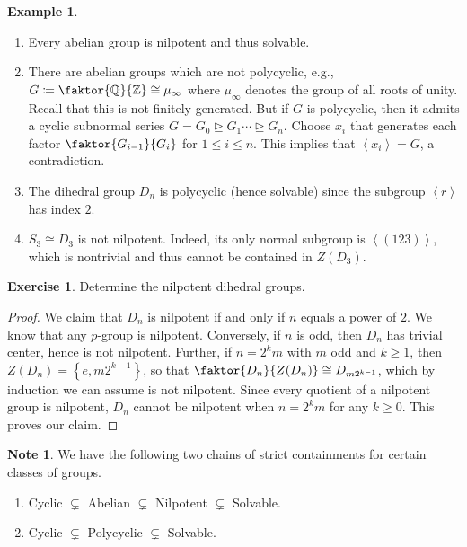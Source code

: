 \documentclass[10pt,letterpaper,cm]{nupset}
\theoremstyle{definition}
\newtheorem{exmp}[definition]{Example}
\newtheorem{note}[definition]{Note}
\theoremstyle{theorem}
\newtheorem{exercise}[definition]{Exercise}
\theoremstyle{remark}
\newcommand{\Q}{\mathbb Q}
\newcommand{\Z}{\mathbb Z}
\newcommand{\1}{\mathbf{1}}
\newcommand{\0}{\vec 0}
\begin{document}
\begin{exmp}  $ $
\begin{enumerate}
\item Every abelian group is nilpotent and thus solvable. 
\item There are abelian groups which are not polycyclic, e.g., $G\coloneqq \faktor{\Q}{\Z} \cong \mu_{\infty}$ where $\mu_{\infty}$ denotes the group of all roots of unity. Recall that this is  not finitely generated.  But if $G$ is polycyclic, then it admits a cyclic subnormal series $G = G_0 \unrhd G_1 \cdots \unrhd G_n$. Choose $x_i$ that generates each factor $\faktor{G_{i-1}}{G_i}$ for $1\leq i \leq n$.  This implies that $\left\langle x_i\right\rangle = G$, a contradiction. 
\item The dihedral group $D_n$ is polycyclic (hence solvable) since the subgroup $\left\langle r\right\rangle$ has index $2$.
\item $S_3\cong D_3$ is not nilpotent. Indeed, its only normal subgroup is $\left\langle (1 2 3)\right\rangle$, which is nontrivial and thus cannot be contained in $Z(D_3)$.
\end{enumerate}
\end{exmp}

\begin{exercise}
Determine the nilpotent dihedral groups. 
\end{exercise}
\begin{proof}
We claim that $D_n$ is nilpotent  if and only if $n$ equals a power of $2$. We know that any $p$-group is nilpotent. Conversely, if $n$ is odd, then $D_n$ has trivial center, hence is not nilpotent. Further, if $n= 2^km$ with $m$ odd and $k\geq 1$, then $Z(D_n) = \left\{e, m2^{k-1}\right\}$, so that $\faktor{D_n}{Z(D_n)} \cong D_{m2^{k-1}}$, which by induction we can assume is not nilpotent. Since every quotient of a nilpotent group is nilpotent, $D_n$ cannot be nilpotent when $n = 2^km$ for any $k\geq 0$. This proves our claim.
\end{proof}

\begin{note}\label{r10}
 We have the following two chains of strict containments for certain classes of groups.
\begin{enumerate}[label=(\roman*)]
\item Cyclic $\subsetneq$ Abelian $\subsetneq$ Nilpotent $\subsetneq$ Solvable.
\item Cyclic $\subsetneq$ Polycyclic $\subsetneq$  Solvable.
\end{enumerate}
\end{note}
\end{document}
